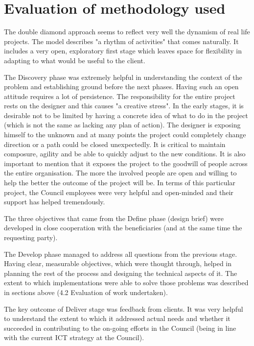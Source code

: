 	\section{Evaluation of methodology used}

The double diamond approach seems to reflect very well the dynamism of real life projects. The model describes "a rhythm of activities" that comes naturally. It includes a very open, exploratory first stage which leaves space for flexibility in adapting to what would be useful to the client.

The Discovery phase was extremely helpful in understanding the context of the problem and establishing ground before the next phases. Having such an open attitude requires a lot of persistence. The responsibility for the entire project rests on the designer and this causes "a creative stress". In the early stages, it is desirable not to be limited by having a concrete idea of what to do in the project (which is not the same as lacking any plan of action). The designer is exposing himself to the unknown and at many points the project could completely change direction or a path could be closed unexpectedly. It is critical to maintain composure, agility and be able to quickly adjust to the new conditions. It is also important to mention that it exposes the project to the goodwill of people across the entire organisation. The more the involved people are open and willing to help the better the outcome of the project will be. In terms of this particular project, the Council employees were very helpful and open-minded and their support has helped tremendously.

The three objectives that came from the Define phase (design brief) were developed in close cooperation with the beneficiaries (and at the same time the requesting party).

The Develop phase managed to address all questions from the previous stage. Having clear, measurable objectives, which were thought through, helped in planning the rest of the process and designing the technical aspects of it. The extent to which implementations were able to solve those problems was described in sections above (4.2 Evaluation of work undertaken).

The key outcome of Deliver stage was feedback from clients. It was very helpful to understand the extent to which it addressed actual needs and whether it succeeded in contributing to the on-going efforts in the Council (being in line with the current ICT strategy at the Council).